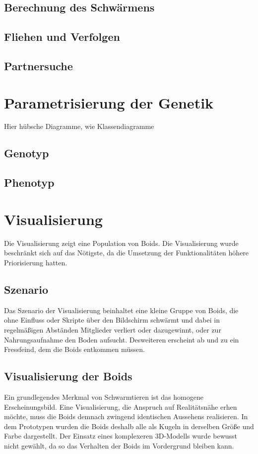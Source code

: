 \documentclass[draft=false
              ,paper=a4
              ,twoside=false
              ,fontsize=11pt
              ,headsepline
              ,BCOR10mm
              ,DIV11
              ,bibtotoc
              ,liststotoc
              ]{scrbook}
\begin{document}
\subsection{Berechnung des Schwärmens}
\subsection{Fliehen und Verfolgen}
\subsection{Partnersuche}
\section{Parametrisierung der Genetik}
Hier hübsche Diagramme, wie Klassendiagramme
\subsection{Genotyp}
\subsection{Phenotyp}

\section{Visualisierung}
Die Visualisierung zeigt eine Population von Boids. Die Visualisierung wurde beschränkt sich auf das Nötigste, da die Umsetzung der Funktionalitäten höhere Priorisierung hatten.
\subsection{Szenario}
Das Szenario der Visualisierung beinhaltet eine kleine Gruppe von Boids, die ohne Einfluss oder Skripte über den Bildschirm schwärmt und dabei in regelmäßigen Abständen Mitglieder verliert oder dazugewinnt, oder zur Nahrungsaufnahme den Boden aufsucht. Desweiteren erscheint ab und zu ein Fressfeind, dem die Boids entkommen müssen.
\subsection{Visualisierung der Boids}
Ein grundlegendes Merkmal von Schwarmtieren ist das homogene Erscheinungsbild. Eine Visualisierung, die Anspruch auf Realitätsnähe erhen möchte, muss die Boids demnach zwingend identischen Aussehens realisieren. In dem Prototypen wurden die Boids deshalb alle als Kugeln in derselben Größe und Farbe dargestellt. Der Einsatz eines komplexeren 3D-Modells wurde bewusst nicht gewählt, da so das Verhalten der Boids im Vordergrund bleiben kann.
\end{document}

